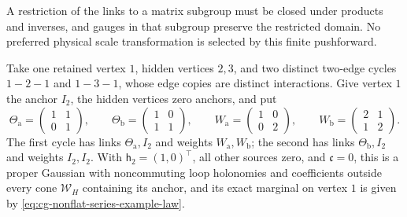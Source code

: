 A restriction of the links to a matrix subgroup must be closed under products
and inverses, and gauges in that subgroup preserve the restricted domain. No
preferred physical scale transformation is selected by this finite pushforward.

Take one retained vertex \(1\), hidden vertices \(2,3\), and two distinct
two-edge cycles \(1-2-1\) and \(1-3-1\), whose edge copies are distinct
interactions. Give vertex \(1\) the anchor \(I_2\), the hidden vertices zero
anchors, and put
\begin{equation}
\Theta_{\mathrm a}=\begin{pmatrix}1&1\\0&1\end{pmatrix},\qquad
\Theta_{\mathrm b}=\begin{pmatrix}1&0\\1&1\end{pmatrix},\qquad
W_{\mathrm a}=\begin{pmatrix}1&0\\0&2\end{pmatrix},\qquad
W_{\mathrm b}=\begin{pmatrix}2&1\\1&2\end{pmatrix}.
\label{eq:cg-nonflat-series-example-data}
\end{equation}
The first cycle has links \(\Theta_{\mathrm a},I_2\) and weights
\(W_{\mathrm a},W_{\mathrm b}\); the second has links \(\Theta_{\mathrm b},I_2\)
and weights \(I_2,I_2\). With \(\mathsf h_2=(1,0)^\top\), all other sources
zero, and \(\mathfrak c=0\), this is a proper Gaussian with noncommuting loop
holonomies and coefficients outside every cone \(\mathcal W_H\) containing its
anchor, and its exact marginal on vertex \(1\) is given by
\eqref{eq:cg-nonflat-series-example-law}. 

